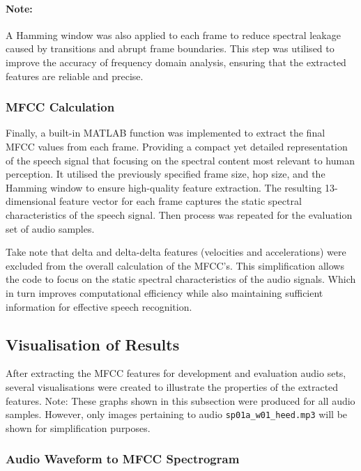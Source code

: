 \documentclass{article}
\begin{document}
\paragraph{Note:} A Hamming window was also applied to each frame to reduce spectral leakage caused by transitions and abrupt frame boundaries. This step was utilised to improve the accuracy of frequency domain analysis, ensuring that the extracted features are reliable and precise.

\subsubsection{MFCC Calculation}

Finally, a built-in MATLAB function was implemented to extract the final MFCC values from each frame. Providing a compact yet detailed representation of the speech signal that focusing on the spectral content most relevant to human perception. It utilised the previously specified frame size, hop size, and the Hamming window to ensure high-quality feature extraction. The resulting 13-dimensional feature vector for each frame captures the static spectral characteristics of the speech signal. Then process was repeated for the evaluation set of audio samples.

Take note that delta and delta-delta features (velocities and accelerations) were excluded from the overall calculation of the MFCC’s. This simplification allows the code to focus on the static spectral characteristics of the audio signals. Which in turn improves computational efficiency while also maintaining sufficient information for effective speech recognition.

\subsection{Visualisation of Results}

After extracting the MFCC features for development and evaluation audio sets, several visualisations were created to illustrate the properties of the extracted features. Note: These graphs shown in this subsection were produced for all audio samples. However, only images pertaining to audio \verb+sp01a_w01_heed.mp3+ will be shown for simplification purposes.

\subsubsection{Audio Waveform to MFCC Spectrogram}
\end{document}

